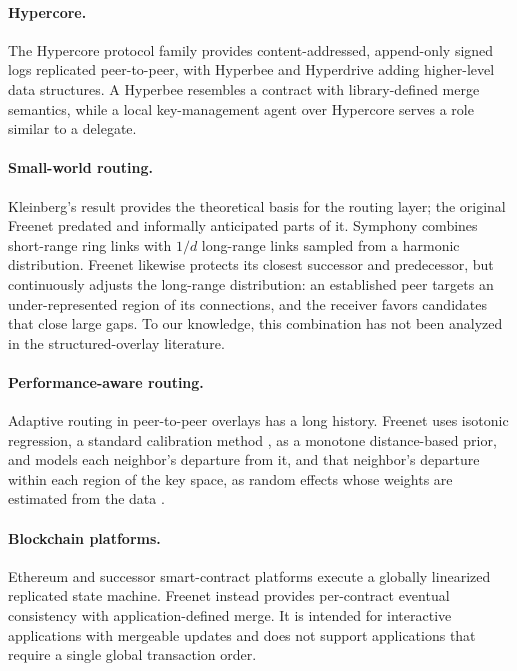 \paragraph{Hypercore.} The Hypercore protocol family \citep{hypercore} provides content-addressed, append-only signed logs replicated peer-to-peer, with Hyperbee and Hyperdrive adding higher-level data structures. A Hyperbee resembles a contract with library-defined merge semantics, while a local key-management agent over Hypercore serves a role similar to a delegate.

\paragraph{Small-world routing.} Kleinberg's result \citep{kleinberg2000small} provides the theoretical basis for the routing layer; the original Freenet \citep{clarke2001freenet} predated and informally anticipated parts of it. Symphony \citep{manku2003symphony} combines short-range ring links with $1/d$ long-range links sampled from a harmonic distribution. Freenet likewise protects its closest successor and predecessor, but continuously adjusts the long-range distribution: an established peer targets an under-represented region of its connections, and the receiver favors candidates that close large gaps. To our knowledge, this combination has not been analyzed in the structured-overlay literature.

\paragraph{Performance-aware routing.} Adaptive routing in peer-to-peer overlays has a long history. Freenet uses isotonic regression, a standard calibration method \citep{deleeuw2009isotone}, as a monotone distance-based prior, and models each neighbor's departure from it, and that neighbor's departure within each region of the key space, as random effects whose weights are estimated from the data \citep{morris1983eb}.

\paragraph{Blockchain platforms.} Ethereum \citep{wood2014ethereum} and successor smart-contract platforms execute a globally linearized replicated state machine. Freenet instead provides per-contract eventual consistency with application-defined merge. It is intended for interactive applications with mergeable updates and does not support applications that require a single global transaction order.

